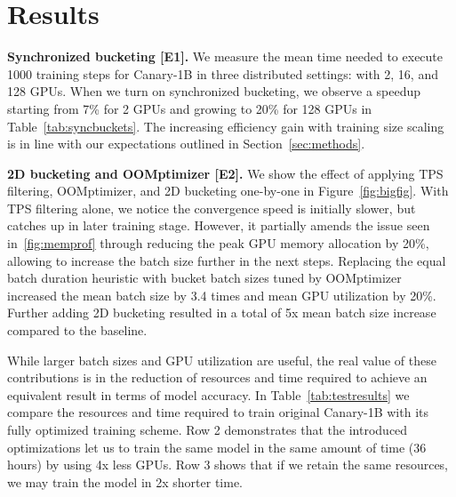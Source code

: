 \documentclass[11pt]{article}
\begin{document}
\section{Results}
\label{sec:results}

\textbf{Synchronized bucketing [E1].} 
We measure the mean time needed to execute 1000 training steps for Canary-1B in three distributed settings: with 2, 16, and 128 GPUs. 
When we turn on synchronized bucketing, we observe a speedup starting from 7\% for 2 GPUs and growing to 20\% for 128 GPUs in Table~\ref{tab:syncbuckets}. 
The increasing efficiency gain with training size scaling is in line with our expectations outlined in Section~\ref{sec:methods}.

\textbf{2D bucketing and OOMptimizer [E2].}
We show the effect of applying TPS filtering, OOMptimizer, and 2D bucketing one-by-one in Figure~\ref{fig:bigfig}. 
With TPS filtering alone, we notice the convergence speed is initially slower, but catches up in later training stage. 
However, it partially amends the issue seen in~\ref{fig:memprof} through reducing the peak GPU memory allocation by 20\%, allowing to increase the batch size further in the next steps.
Replacing the equal batch duration heuristic with bucket batch sizes tuned by OOMptimizer increased the mean batch size by 3.4 times and mean GPU utilization by 20\%. 
Further adding 2D bucketing resulted in a total of 5x mean batch size increase compared to the baseline.

While larger batch sizes and GPU utilization are useful, the real value of these contributions is in the reduction of resources and time required to achieve an equivalent result in terms of model accuracy.
In Table~\ref{tab:testresults} we compare the resources and time required to train original Canary-1B with its fully optimized training scheme.
Row 2 demonstrates that the introduced optimizations let us to train the same model in the same amount of time (36 hours) by using 4x less GPUs. 
Row 3 shows that if we retain the same resources, we may train the model in 2x shorter time.
\end{document}
